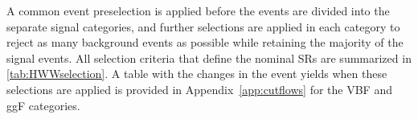 



A common event preselection is applied before the events are divided into the separate signal categories, and further selections are applied in each category to reject as many background events as possible while retaining the majority of the signal events.
All selection criteria that define the nominal SRs are summarized in \cref{tab:HWWselection}. 
A table with the changes in the event yields when these selections are applied is provided in Appendix~\ref{app:cutflows} for the VBF and ggF \TwoJet categories. 

\begin{table}[!ht]
    \centering
    \caption[Event selection criteria used to define the nominal signal regions.]{
    Event selection criteria used to define the nominal signal regions in the \hww\ analysis. The definitions of the variables can be found in the text.
    \label{tab:HWWselection}
    }
    \resizebox{\textwidth}{!}{
    
    }
\end{table}

